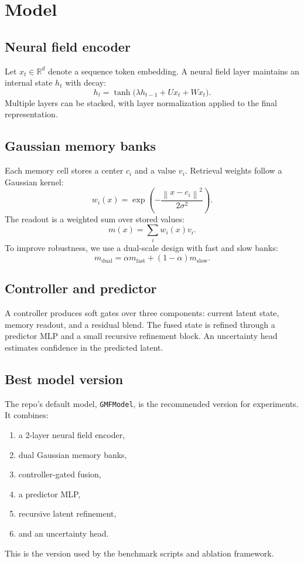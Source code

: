 \documentclass{article}
\newcommand{\R}{\mathbb{R}}
\newcommand{\norm}[1]{\left\lVert #1 \right\rVert}
\begin{document}
\section{Model}
\subsection{Neural field encoder}
Let $x_t \in \R^d$ denote a sequence token embedding. A neural field layer maintains an internal state $h_t$ with decay:
\[
 h_t = \tanh\big(\lambda h_{t-1} + Ux_t + Wx_t\big).
\]
Multiple layers can be stacked, with layer normalization applied to the final representation.

\subsection{Gaussian memory banks}
Each memory cell stores a center $c_i$ and a value $v_i$. Retrieval weights follow a Gaussian kernel:
\[
 w_i(x) = \exp\left(-\frac{\norm{x-c_i}^2}{2\sigma^2}\right).
\]
The readout is a weighted sum over stored values:
\[
 m(x) = \sum_i w_i(x) v_i.
\]
To improve robustness, we use a dual-scale design with fast and slow banks:
\[
 m_{\mathrm{dual}} = \alpha m_{\mathrm{fast}} + (1-\alpha)m_{\mathrm{slow}}.
\]

\subsection{Controller and predictor}
A controller produces soft gates over three components: current latent state, memory readout, and a residual blend. The fused state is refined through a predictor MLP and a small recursive refinement block. An uncertainty head estimates confidence in the predicted latent.

\subsection{Best model version}
The repo's default model, \texttt{GMFModel}, is the recommended version for experiments. It combines:
\begin{enumerate}[leftmargin=*]
\item a 2-layer neural field encoder,
\item dual Gaussian memory banks,
\item controller-gated fusion,
\item a predictor MLP,
\item recursive latent refinement,
\item and an uncertainty head.
\end{enumerate}
This is the version used by the benchmark scripts and ablation framework.
\end{document}
